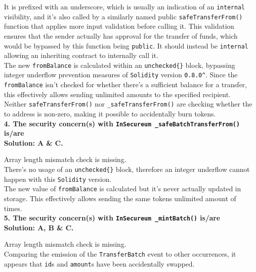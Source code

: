 It is prefixed with an underscore, which is usually an indication of an \verb|internal| visibility, and it's also called by a similarly named public \verb|safeTransferFrom()| function that applies more input validation before calling it.
This validation ensures that the sender actually has approval for the transfer of funds, which would be bypassed by this function being \verb|public|.
It should instead be \verb|internal| allowing an inheriting contract to internally call it.\\

The new \verb|fromBalance| is calculated within an \verb|unchecked{}| block, bypassing integer underflow prevention measures of \verb|Solidity| version \verb|0.8.0^|.
Since the \verb|fromBalance| isn't checked for whether there's a sufficient balance for a transfer, this effectively allows sending unlimited amounts to the specified recipient.\\

Neither \verb|safeTransferFrom()| nor \verb|_safeTransferFrom()| are checking whether the to address is non-zero, making it possible to accidentally burn tokens.\\

\textbf{4. The security concern(s) with \texttt{InSecureum \_safeBatchTransferFrom()} is/are}\label{sec:race5_q4}\\

\textbf{Solution: A \& C.}

Array length mismatch check is missing.\\

There's no usage of an \verb|unchecked{}| block, therefore an integer underflow cannot happen with this \verb|Solidity| version.\\

The new value of \verb|fromBalance| is calculated but it's never actually updated in storage.
This effectively allows sending the same tokens unlimited amount of times.\\

\textbf{5. The security concern(s) with \texttt{InSecureum \_mintBatch()} is/are}\label{sec:race5_q5}\\

\textbf{Solution: A, B \& C.}

Array length mismatch check is missing.\\

Comparing the emission of the \verb|TransferBatch| event to other occurrences, it appears that \verb|id|s and \verb|amount|s have been accidentally swapped.\\

